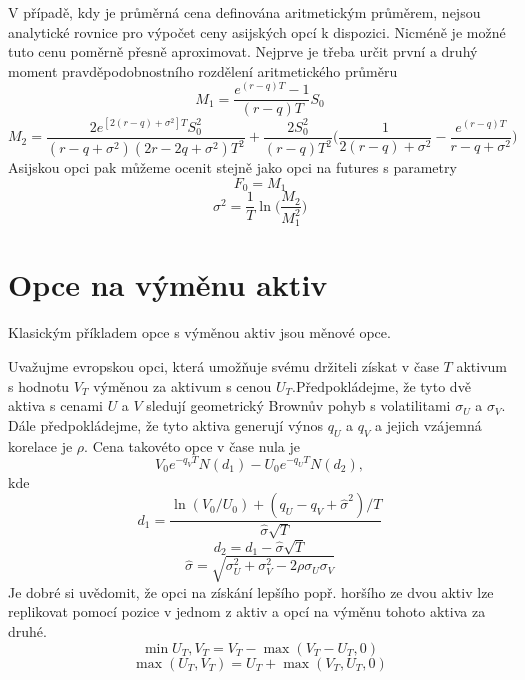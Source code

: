 \documentclass[a4paper]{book}
\begin{document}
V případě, kdy je průměrná cena definována aritmetickým průměrem, nejsou analytické rovnice pro výpočet ceny asijských opcí k dispozici. Nicméně je možné tuto cenu poměrně přesně aproximovat. Nejprve je třeba určit první a druhý moment pravděpodobnostního rozdělení aritmetického průměru
\begin{equation*}
M_1 = \frac{e^{(r-q)T}-1}{(r-q)T}S_0
\end{equation*}
\begin{equation*}
M_2 = \frac{2e^{[2(r-q)+\sigma^2]T}S_0^2}{(r-q+\sigma^2)(2r-2q+\sigma^2)T^2}+\frac{2S_0^2}{(r-q)T^2}\Bigg( \frac{1}{2(r-q)+\sigma^2}-\frac{e^{(r-q)T}}{r-q+\sigma^2}\Bigg)
\end{equation*}
Asijskou opci pak můžeme ocenit stejně jako opci na futures s parametry
\begin{equation*}
F_0 = M_1
\end{equation*}
\begin{equation*}
\sigma^2 = \frac{1}{T}\ln \Bigg( \frac{M_2}{M_1^2} \Bigg)
\end{equation*}

\section{Opce na výměnu aktiv}

Klasickým příkladem opce s výměnou aktiv jsou měnové opce.

Uvažujme evropskou opci, která umožňuje svému držiteli získat v čase $T$ aktivum s hodnotu $V_T$ výměnou za aktivum s cenou $U_T$.Předpokládejme, že tyto dvě aktiva s cenami $U$ a $V$ sledují geometrický Brownův pohyb s volatilitami $\sigma_U$ a $\sigma_V$. Dále předpokládejme, že tyto aktiva generují výnos $q_U$ a $q_V$ a jejich vzájemná korelace je $\rho$. Cena takovéto opce v čase nula je
\begin{equation*}
V_0e^{-q_VT}N(d_1)-U_0e^{-q_UT}N(d_2),
\end{equation*}
kde
\begin{equation*}
d_1 = \frac{\ln(V_0/U_0)+(q_U - q_V + \hat{\sigma}^2)/T}{\hat{\sigma}\sqrt{T}}
\end{equation*}
\begin{equation*}
d_2 = d_1 - \hat{\sigma}\sqrt{T}
\end{equation*}
\begin{equation*}
\hat{\sigma}=\sqrt{\sigma_U^2 + \sigma_V^2 - 2\rho \sigma_U \sigma_V}
\end{equation*}
Je dobré si uvědomit, že opci na získání lepšího popř. horšího ze dvou aktiv lze replikovat pomocí pozice v jednom z aktiv a opcí na výměnu tohoto aktiva za druhé.
\begin{equation*}
\min{U_T, V_T} = V_T - \max(V_T - U_T, 0)
\end{equation*}
\begin{equation*}
\max(U_T, V_T) = U_T + \max(V_T, U_T,0)
\end{equation*}
\end{document}
